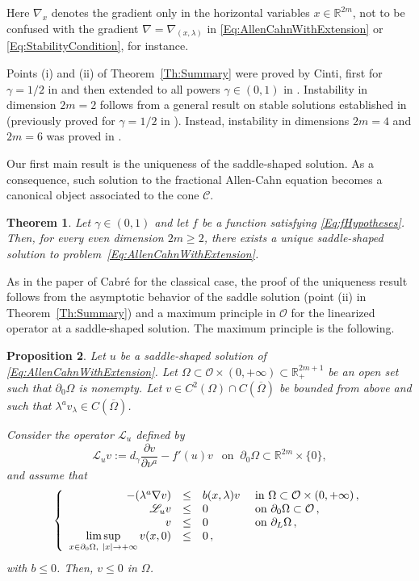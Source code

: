 \documentclass[twoside,leqno,symbols-for-thanks, draft]{rmi}
\numberwithin{equation}{section}
\newtheorem{theorem}{Theorem}[section]
\newtheorem{proposition}[theorem]{Proposition}
\theoremstyle{definition}
\newcommand{\con}[1]{\mathbb{#1}}
\newcommand{\R}{\con{R}} %
\newcommand{\ccal}{\mathscr{C}}
\newcommand{\ocal}{\mathcal{O}}
\newcommand{\s}{\gamma}
\newcommand\beqc[1]{\left\{\begin{array}{#1}}
\newcommand\eeqc{\end{array} \right.}
\def\PDEsystem{rcll}
\let\div\relax
\DeclareMathOperator{\div}{div}
\def\ds{\displaystyle}
\begin{document}
Here $\nabla_x$ denotes the gradient only in the horizontal variables $x\in \R^{2m}$, not to be confused with the gradient $\nabla = \nabla_{(x,\lambda)}$ in \eqref{Eq:AllenCahnWithExtension} or \eqref{Eq:StabilityCondition}, for instance.

Points (i) and (ii) of Theorem~\ref{Th:Summary} were proved by Cinti, first for $\s = 1/2$  in \cite{Cinti-Saddle} and then extended to all powers $\s \in (0,1)$ in \cite{Cinti-Saddle2}. Instability in dimension $2m = 2$ follows from a general result on stable solutions established in \cite{CabreSireII} (previously proved for $\s = 1/2$ in \cite{CabreSolaMorales}). Instead, instability in dimensions $2m=4$ and $2m=6$ was proved in \cite{Cinti-Saddle,Cinti-Saddle2}.


Our first main result is the uniqueness of the saddle-shaped solution. As a consequence, such solution to the fractional Allen-Cahn equation becomes a canonical object associated to the cone $\ccal$.

\begin{theorem}
	\label{Thm:Uniqueness}
	Let $\s \in (0,1)$  and let $f$ be a function satisfying \eqref{Eq:fHypotheses}. Then, for every even dimension $2m\geq 2$, there exists a unique saddle-shaped solution to problem~\eqref{Eq:AllenCahnWithExtension}.
\end{theorem}

As in the paper of Cabr\'e \cite{Cabre-Saddle} for the classical case, the proof of the uniqueness result follows from the asymptotic behavior of the saddle solution (point (ii) in Theorem~\ref{Th:Summary}) and a maximum principle in $\ocal$ for the linearized operator at a saddle-shaped solution. The maximum principle is the following.

\begin{proposition}
	\label{Prop:MaxPrincipleLinearizedOperator}
	Let $u$ be a saddle-shaped solution of \eqref{Eq:AllenCahnWithExtension}. 
	Let $\Omega \subset \ocal \times (0,+\infty) \subset \R^{2m+1}_+$ be an open set such that $\partial_0 \Omega$ is nonempty. Let $v \in C^2 (\Omega)\cap C(\overline{\Omega})$ be bounded from above and such that $\lambda^a v_\lambda \in C(\overline{\Omega})$. 
	
	Consider the operator $\mathscr{L}_u $ defined by 
	\begin{equation}
	\label{Eq:LinearizedOperator}
	\mathscr{L}_u v := d_\s \dfrac{\partial v}{\partial \nu^a}  -f'(u) v \ \ \text{ on } \ \partial_0 \Omega \subset \R^{2m}\times\{0\},
	\end{equation}
	and assume that
	$$
	\beqc{\PDEsystem}
	-\div(\lambda^a \nabla v) &\leq& b(x,\lambda) v & \text{ in } \Omega \subset \ocal \times (0,+\infty)\,, \\
	\mathscr{L}_u v &\leq & 0 & \text{ on } \partial_0 \Omega \subset \ocal \,, \\
	v & \leq & 0 & \text{ on } \partial_L \Omega \,,\\
	\ds \limsup_{x\in \partial_0 \Omega, \  |x|\to +\infty} v(x,0) & \leq & 0\,,
	\eeqc
	$$
	with $b \leq 0$. Then, $v\leq 0$ in $\Omega$.
\end{proposition}
\end{document}
